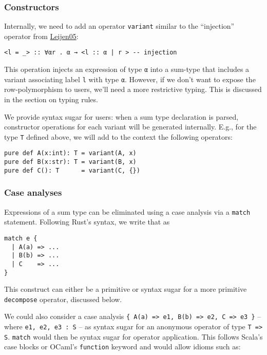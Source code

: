 \documentclass[11pt]{article}
\begin{document}
\subsubsection{Constructors}
\label{sec:orgc7e9737}

Internally, we need to add an operator \texttt{variant} similar to the ``injection''
operator from \href{https://www.microsoft.com/en-us/research/publication/extensible-records-with-scoped-labels/}{Leijen05}:

\begin{verbatim}
<l = _> :: ∀αr . α → <l :: α | r > -- injection
\end{verbatim}


This operation injects an expression of type \texttt{α} into a sum-type that includes a
variant associating label \texttt{l} with type \texttt{α}.  However, if we don't want to
expose the row-polymorphism to users, we'll need a more restrictive typing. This
is discussed in the section on typing rules.

We provide syntax sugar for users: when a sum type declaration is parsed,
constructor operations for each variant will be generated internally. E.g., for
the type \texttt{T} defined above, we will add to the context the following operators:

\begin{verbatim}
pure def A(x:int): T = variant(A, x)
pure def B(x:str): T = variant(B, x)
pure def C(): T      = variant(C, {})
\end{verbatim}

\subsubsection{Case analyses}
\label{sec:orgc4b162c}
Expressions of a sum type can be eliminated using a case analysis via
a \texttt{match} statement. Following Rust's syntax, we write that as

\begin{verbatim}
match e {
  | A(a) => ...
  | B(b) => ...
  | C    => ...
}
\end{verbatim}

This construct can either be a primitive or syntax sugar for a more
primitive \texttt{decompose} operator, discussed below.

We could also consider a case analysis \texttt{\{ A(a) => e1, B(b) => e2, C => e3 \}} --
where \texttt{e1, e2, e3 : S} -- as syntax sugar for an anonymous operator of type \texttt{T
=> S}. \texttt{match} would then be syntax sugar for operator application. This follows
Scala's case blocks or OCaml's \texttt{function} keyword and would allow idioms such
as:
\end{document}
